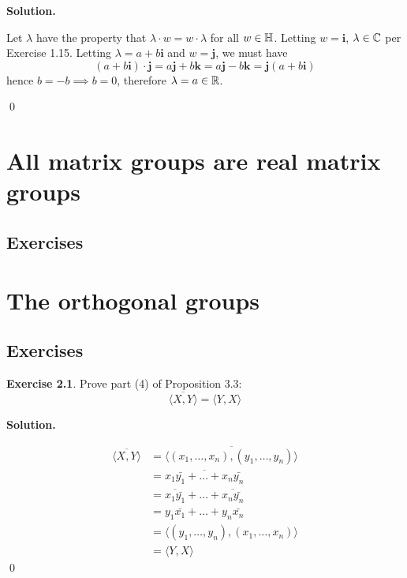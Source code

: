 \documentclass[12pt]{book}
\theoremstyle{definition}
\newtheorem{exercise}{Exercise}[chapter]
\newenvironment{solution}
{%
  \par\noindent\textbf{Solution.}\quad
}
{%
  \qed\par
}
\begin{document}
\begin{solution}
  Let $\lambda$ have the property that $\lambda \cdot w = w \cdot \lambda$ for all $w \in \mathbb{H}$.
  Letting $w = \mathbf{i}$, $\lambda \in \mathbb{C}$ per Exercise 1.15.
  Letting $\lambda = a+b\mathbf{i}$ and $w = \mathbf{j}$, we must have
  \[
    (a+b\mathbf{i}) \cdot \mathbf{j} = a\mathbf{j} + b\mathbf{k} = a\mathbf{j} - b\mathbf{k} = \mathbf{j}(a+b \mathbf{i})
  \]
  hence $b = -b \implies b = 0$, therefore $\lambda = a \in \mathbb{R}$.
  
\end{solution}

\chapter{All matrix groups are real matrix groups}
\section{Exercises}


\chapter{The orthogonal groups}
\section{Exercises}

\begin{exercise}
  Prove part (4) of Proposition 3.3:
  \[
  \overline{\langle X, Y \rangle} = \langle Y, X \rangle
  \]
\end{exercise}
\begin{solution}
  \[
  \begin{aligned}
    \overline{\langle X, Y \rangle} &= \overline{\langle (x_1, \dots , x_n), (y_1, \dots , y_n) \rangle} \\
                                    &= \overline{x_1\bar{y_1} + \dots + x_n\bar{y_n}} \\
                                    &= \overline{x_1 \bar{y_1}} + \dots + \overline{x_n \bar{y_n}} \\
                                    &= y_1\bar{x_1} + \dots + y_n\bar{x_n} \\
                                    &= \langle (y_1, \dots , y_n), (x_1, \dots , x_n) \rangle \\
                                    &= \langle Y, X \rangle
  \end{aligned}
  \]
\end{solution}
\end{document}
